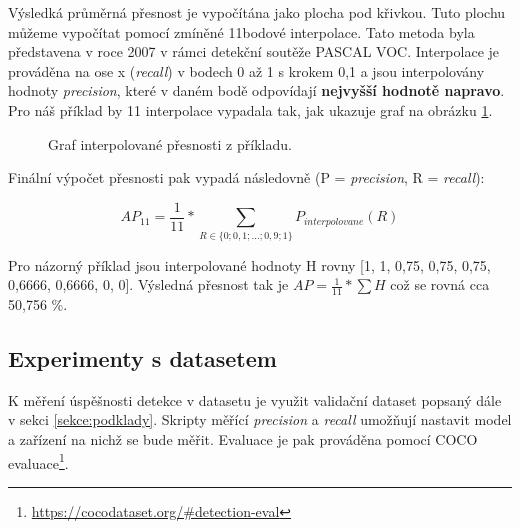 Výsledká průměrná přesnost je vypočítána jako plocha pod křivkou. Tuto plochu můžeme vypočítat pomocí zmíněné 11bodové interpolace. Tato metoda byla představena v roce 2007 v rámci detekční soutěže PASCAL VOC. Interpolace je prováděna na ose x (\emph{recall}) v bodech 0 až 1 s krokem 0,1 a jsou interpolovány hodnoty \emph{precision}, které v daném bodě odpovídají \textbf{nejvyšší hodnotě napravo}. Pro náš příklad by 11 interpolace vypadala tak, jak ukazuje graf na obrázku \ref{obrazek:interpolace}.

\begin{figure}[H] 
  \begin{center}
  \label{obrazek:interpolace}
  \caption{Graf interpolované přesnosti z příkladu.}
  \end{center}
\end{figure}

\noindent Finální výpočet přesnosti pak vypadá následovně \cite{interpolace, detekceMetriky} (P = \emph{precision}, R = \emph{recall}):

\begin{equation}
  AP_{11} = \frac{1}{11} * \sum_{R \in \{0;0,1;...;0,9;1\}} P_{interpolovane} (R)
\end{equation}

Pro názorný příklad jsou interpolované hodnoty H rovny [1, 1, 0,75, 0,75, 0,75, 0,6666, 0,6666, 0, 0]. Výsledná přesnost tak je $AP = \frac{1}{11} * \sum H$ což se rovná cca 50,756 \%.

\subsection*{Experimenty s datasetem}
K měření úspěšnosti detekce v datasetu je využit validační dataset popsaný dále v sekci \ref{sekce:podklady}. Skripty měřící \emph{precision} a \emph{recall} umožňují nastavit model a zařízení na nichž se bude měřit. Evaluace je pak prováděna pomocí COCO evaluace\footnote{\url{https://cocodataset.org/\#detection-eval}}. 

